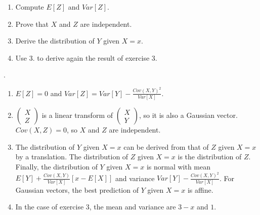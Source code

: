 \documentclass[12pt]{article}
\newcommand \noi \noindent
\newcommand{\dsp}{\displaystyle}
\begin{document}
\begin{enumerate}

\item Compute $E[Z]$ and $Var[Z]$.

\vspace{1mm}

\item Prove that $X$ and $Z$ are independent.

\vspace{1mm}

\item Derive the distribution of $Y$ given $X=x$.

\vspace{1mm}

\item Use 3. to derive again the result of exercise 3.

\end{enumerate}

\vspace{3mm}

\noi {\it Indications}. 

\begin{enumerate}

\item $E[Z] = 0$ and $Var[Z] = Var[Y] - {\dsp \frac{Cov(X,Y)^2}{Var[X]}}$.

\vspace{1mm}

\item $\left( \begin{array}{c} X \\ Z\end{array} \right)$ is a linear transform of $\left( \begin{array}{c} X \\ Y\end{array} \right)$, so it is also a Gaussian vector. $Cov(X,Z) = 0$, so $X$ and $Z$ are independent.

\vspace{1mm}

\item The distribution of $Y$ given $X=x$ can be derived from that of $Z$ given $X=x$ by a translation. The distribution of $Z$ given $X=x$ is the distribution of $Z$. Finally, the distribution of $Y$ given $X=x$ is normal with mean $E[Y] + {\dsp \frac{Cov(X,Y)}{Var[X]}} \left[x - E[X]\right]$ and variance $Var[Y] - {\dsp \frac{Cov(X,Y)^2}{Var[X]}}$.  For Gaussian vectors, the best prediction of $Y$ given $X=x$ is affine.

\vspace{1mm}

\item In the case of exercise 3, the mean and variance are $3-x$ and $1$.

\end{enumerate}
\end{document}
